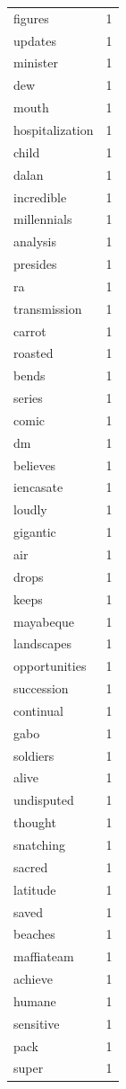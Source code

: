 \begin{tabular}{lr}
figures & 1 \\
updates & 1 \\
minister & 1 \\
dew & 1 \\
mouth & 1 \\
hospitalization & 1 \\
child & 1 \\
dalan & 1 \\
incredible & 1 \\
millennials & 1 \\
analysis & 1 \\
presides & 1 \\
ra & 1 \\
transmission & 1 \\
carrot & 1 \\
roasted & 1 \\
bends & 1 \\
series & 1 \\
comic & 1 \\
dm & 1 \\
believes & 1 \\
iencasate & 1 \\
loudly & 1 \\
gigantic & 1 \\
air & 1 \\
drops & 1 \\
keeps & 1 \\
mayabeque & 1 \\
landscapes & 1 \\
opportunities & 1 \\
succession & 1 \\
continual & 1 \\
gabo & 1 \\
soldiers & 1 \\
alive & 1 \\
undisputed & 1 \\
thought & 1 \\
snatching & 1 \\
sacred & 1 \\
latitude & 1 \\
saved & 1 \\
beaches & 1 \\
maffiateam & 1 \\
achieve & 1 \\
humane & 1 \\
sensitive & 1 \\
pack & 1 \\
super & 1 \\

\end{tabular}
